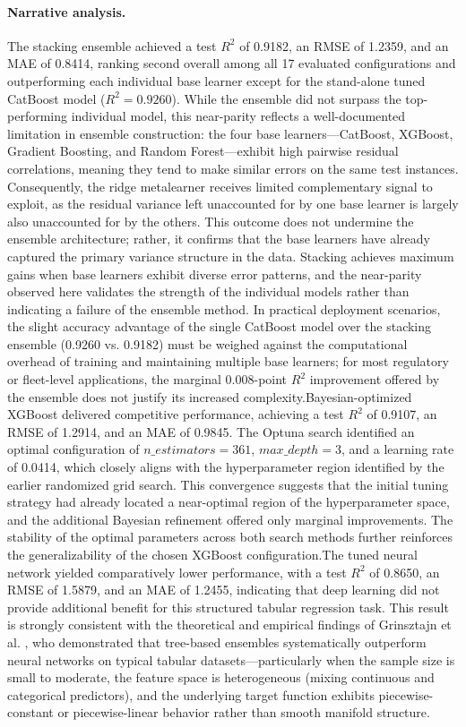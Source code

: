 \paragraph{Narrative analysis.}
The stacking ensemble achieved a test \(R^2\) of 0.9182, an RMSE of 1.2359, and an MAE of 0.8414, ranking second overall among all 17 evaluated configurations and outperforming each individual base learner except for the stand-alone tuned CatBoost model (\(R^2 = 0.9260\)). While the ensemble did not surpass the top-performing individual model, this near-parity reflects a well-documented limitation in ensemble construction: the four base learners—CatBoost, XGBoost, Gradient Boosting, and Random Forest—exhibit high pairwise residual correlations, meaning they tend to make similar errors on the same test instances. Consequently, the ridge metalearner receives limited complementary signal to exploit, as the residual variance left unaccounted for by one base learner is largely also unaccounted for by the others. This outcome does not undermine the ensemble architecture; rather, it confirms that the base learners have already captured the primary variance structure in the data. Stacking achieves maximum gains when base learners exhibit diverse error patterns, and the near-parity observed here validates the strength of the individual models rather than indicating a failure of the ensemble method. In practical deployment scenarios, the slight accuracy advantage of the single CatBoost model over the stacking ensemble (0.9260 vs. 0.9182) must be weighed against the computational overhead of training and maintaining multiple base learners; for most regulatory or fleet-level applications, the marginal 0.008-point \(R^2\) improvement offered by the ensemble does not justify its increased complexity.Bayesian-optimized XGBoost delivered competitive performance, achieving a test \(R^2\) of 0.9107, an RMSE of 1.2914, and an MAE of 0.9845. The Optuna search identified an optimal configuration of \(n\_estimators = 361\), \(max\_depth = 3\), and a learning rate of 0.0414, which closely aligns with the hyperparameter region identified by the earlier randomized grid search. This convergence suggests that the initial tuning strategy had already located a near-optimal region of the hyperparameter space, and the additional Bayesian refinement offered only marginal improvements. The stability of the optimal parameters across both search methods further reinforces the generalizability of the chosen XGBoost configuration.The tuned neural network yielded comparatively lower performance, with a test \(R^2\) of 0.8650, an RMSE of 1.5879, and an MAE of 1.2455, indicating that deep learning did not provide additional benefit for this structured tabular regression task. This result is strongly consistent with the theoretical and empirical findings of Grinsztajn et al. \cite{grinsztajn2022tree}, who demonstrated that tree-based ensembles systematically outperform neural networks on typical tabular datasets—particularly when the sample size is small to moderate, the feature space is heterogeneous (mixing continuous and categorical predictors), and the underlying target function exhibits piecewise-constant or piecewise-linear behavior rather than smooth manifold structure. 